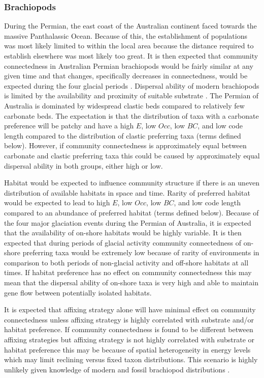 \documentclass[12pt,letterpaper]{article}
\begin{document}
\subsubsection{Brachiopods}
During the Permian, the east coast of the Australian continent faced towards the massive Panthalassic Ocean. Because of this, the establishment of populations was most likely limited to within the local area because the distance required to establish elsewhere was most likely too great. It is then expected that community connectedness in Australian Permian brachiopods would be fairly similar at any given time and that changes, specifically decreases in connectedness, would be expected during the four glacial periods \citep{Fielding2008a,Fielding2008}. Dispersal ability of modern brachiopods is limited by the availability and proximity of suitable substrate \citep{Richardson1997,Richardson1997a}. The Permian of Australia is dominated by widespread clastic beds compared to relatively few carbonate beds. The expectation is that the distribution of taxa with a carbonate preference will be patchy and have a high \(E\), low \(Occ\), low \(BC\), and low code length compared to the distribution of clastic preferring taxa (terms defined below). However, if community connectedness is approximately equal between carbonate and clastic preferring taxa this could be caused by approximately equal dispersal ability in both groups, either high or low.

Habitat would be expected to influence community structure if there is an uneven distribution of available habitats in space and time. Rarity of preferred habitat would be expected to lead to high \(E\), low \(Occ\), low \(BC\), and low code length compared to an abundance of preferred habitat (terms defined below). Because of the four major glaciation events during the Permian of Australia, it is expected that the availability of on-shore habitats would be highly variable. It is then expected that during periods of glacial activity community connectedness of on-shore preferring taxa would be extremely low because of rarity of environments in comparison to both periods of non-glacial activity and off-shore habitats at all times. If habitat preference has no effect on community connectedness this may mean that the dispersal ability of on-shore taxa is very high and able to maintain gene flow between potentially isolated habitats.

It is expected that affixing strategy alone will have minimal effect on community connectedness unless affixing strategy is highly correlated with substrate and/or habitat preference. If community connectedness is found to be different between affixing strategies but affixing strategy is not highly correlated with substrate or habitat preference this may be because of spatial heterogeneity in energy levels which may limit reclining versus fixed taxon distributions. This scenario is highly unlikely given knowledge of modern and fossil brachiopod distributions \citep{Rudwick1970,Richardson1997,Richardson1997a}.
\end{document}
